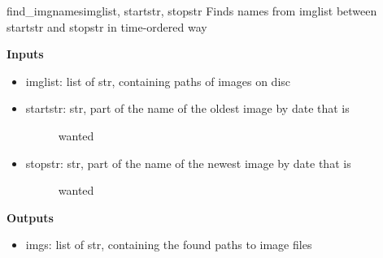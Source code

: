 \documentclass[letterpaper,10pt,english]{manual}
\begin{document}
\hypertarget{odysseus.filetools.find_imgnames}{}\begin{funcdesc}{find\_imgnames}{imglist, startstr, stopstr}
Finds names from imglist between startstr and stopstr in time-ordered way

\textbf{Inputs}
\begin{itemize}
\item {} 
imglist: list of str, containing paths of images on disc

\item {} \begin{description}
\item[startstr: str, part of the name of the oldest image by date that is] \leavevmode
wanted

\end{description}

\item {} \begin{description}
\item[stopstr: str, part of the name of the newest image by date that is] \leavevmode
wanted

\end{description}

\end{itemize}

\textbf{Outputs}
\begin{itemize}
\item {} 
imgs: list of str, containing the found paths to image files

\end{itemize}
\end{funcdesc}
\end{document}
